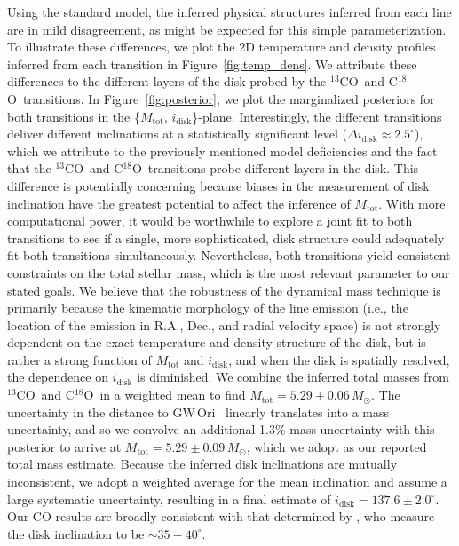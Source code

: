 \documentclass[twocolumn]{aastex61}
\newcommand{\obj}{GW\,Ori}
\newcommand{\thirteen}{${}^{13}$CO}
\newcommand{\eighteen}{C${}^{18}$O}
\begin{document}
Using the standard model, the inferred physical structures inferred from each line are in mild disagreement, as might be expected for this simple parameterization. To illustrate these differences, we plot the 2D temperature and density profiles inferred from each transition in Figure~\ref{fig:temp_dens}. We attribute these differences to the different layers of the disk probed by the \thirteen\ and \eighteen\ transitions. In Figure~\ref{fig:posterior}, we plot the marginalized posteriors for both transitions in the \{$M_\mathrm{tot}$, $i_\mathrm{disk}$\}-plane. Interestingly, the different transitions deliver different inclinations at a statistically significant level ($\Delta i_\mathrm{disk} \approx 2.5^\circ$), which we attribute to the previously mentioned model deficiencies and the fact that the \thirteen\ and \eighteen\ transitions probe different layers in the disk.
This difference is potentially concerning because biases in the measurement of disk inclination have the greatest potential to affect the inference of $M_\mathrm{tot}$. With more computational power, it would be worthwhile to explore a joint fit to both transitions to see if a single, more sophisticated, disk structure could adequately fit both transitions simultaneously.
Nevertheless, both transitions yield consistent constraints on the total stellar mass, which is the most relevant parameter to our stated goals. We believe that the robustness of the dynamical mass technique is primarily because the kinematic morphology of the line emission (i.e., the location of the emission in R.A., Dec., and radial velocity space) is not strongly dependent on the exact temperature and density structure of the disk, but is rather a strong function of $M_\mathrm{tot}$ and $i_\mathrm{disk}$, and when the disk is spatially resolved, the dependence on $i_\mathrm{disk}$ is diminished. We combine the inferred total masses from \thirteen\ and \eighteen\ in a weighted mean to find $M_\mathrm{tot} = 5.29 \pm 0.06\,M_\odot$.
The uncertainty in the distance to \obj\ \citep[$388 \pm 5\,$pc;][]{kounkel17} linearly translates into a mass uncertainty, and so we convolve an additional 1.3\% mass uncertainty with this posterior to arrive at $M_\mathrm{tot} = 5.29 \pm 0.09\,M_\odot$, which we adopt as our reported total mass estimate. Because the inferred disk inclinations are mutually inconsistent, we adopt a weighted average for the mean inclination and assume a large systematic uncertainty, resulting in a final estimate of $i_\mathrm{disk} = 137.6 \pm 2.0^\circ$. Our CO results are broadly consistent with that determined by \citet{fang17}, who measure the disk inclination to be $\sim 35 - 40^\circ$.
\end{document}
